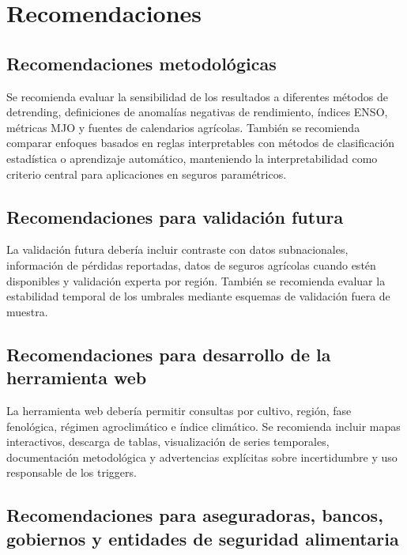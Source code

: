 \chapter{Recomendaciones}

\section{Recomendaciones metodológicas}

Se recomienda evaluar la sensibilidad de los resultados a diferentes métodos de detrending, definiciones de anomalías negativas de rendimiento, índices ENSO, métricas MJO y fuentes de calendarios agrícolas. También se recomienda comparar enfoques basados en reglas interpretables con métodos de clasificación estadística o aprendizaje automático, manteniendo la interpretabilidad como criterio central para aplicaciones en seguros paramétricos.

\section{Recomendaciones para validación futura}

La validación futura debería incluir contraste con datos subnacionales, información de pérdidas reportadas, datos de seguros agrícolas cuando estén disponibles y validación experta por región. También se recomienda evaluar la estabilidad temporal de los umbrales mediante esquemas de validación fuera de muestra.

\section{Recomendaciones para desarrollo de la herramienta web}

La herramienta web debería permitir consultas por cultivo, región, fase fenológica, régimen agroclimático e índice climático. Se recomienda incluir mapas interactivos, descarga de tablas, visualización de series temporales, documentación metodológica y advertencias explícitas sobre incertidumbre y uso responsable de los triggers.


\section{Recomendaciones para aseguradoras, bancos, gobiernos y entidades de seguridad alimentaria}

